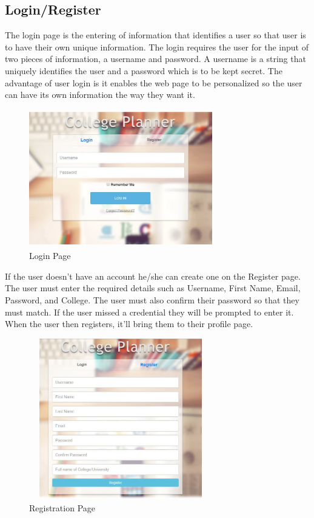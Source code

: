 \subsection{Login/Register}
\par The login page is the entering of information that identifies a user so that user is to have their own unique information. The login requires the user for the input of two pieces of information, a username and password. A username is a string that uniquely identifies the user and a password which is to be kept secret. The advantage of user login is it enables the web page to be personalized so the user can have its own information the way they want it. 
\begin{figure}[h]
\centering
\includegraphics[width=8cm, height=6cm]{img/loginScreen}
\caption{Login Page}
\end{figure}
\newpage
\par If the user doesn’t have an account he/she can create one on the Register page. The user must enter the required details such as Username, First Name, Email, Password, and College. The user must also confirm their password so that they must match. If the user missed a credential they will be prompted to enter it.  When the user then registers, it’ll bring them to their profile page.
\begin{figure}[h]
\centering
\includegraphics[width=8cm, height=7cm]{img/Registration}
\caption{Registration Page}
\end{figure}
\newpage
